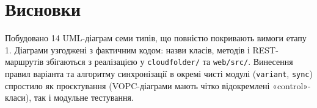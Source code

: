\documentclass[12pt,a4paper]{article}
\begin{document}
\section{Висновки}

Побудовано 14 UML-діаграм семи типів, що повністю покривають вимоги етапу 1. Діаграми узгоджені з фактичним кодом: назви класів, методів і REST-маршрутів збігаються з реалізацією у \texttt{cloudfolder/\allowbreak{}} та \texttt{web/\allowbreak{}src/\allowbreak{}}. Винесення правил варіанта та алгоритму синхронізації в окремі чисті модулі (\texttt{variant}, \texttt{sync}) спростило як проєктування (VOPC-діаграми мають чітко відокремлені «control»-класи), так і модульне тестування.
\end{document}
